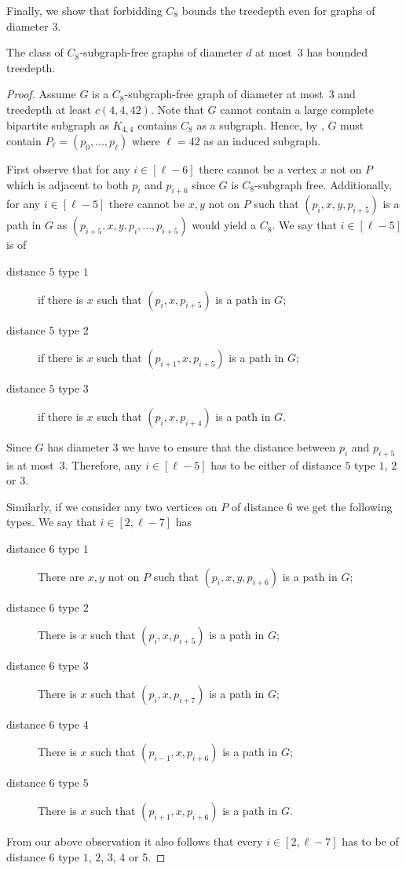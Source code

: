 \documentclass[runningheads,envcountsame]{llncs}
\begin{document}
Finally, we show that forbidding $C_8$ bounds the treedepth even for graphs of diameter $3$.
\begin{theorem}\label{thm:C8d3}
    The class of $C_8$-subgraph-free graphs of diameter $d$ at most~$3$ has bounded treedepth.
\end{theorem}
\begin{proof}
    Assume $G$ is a $C_8$-subgraph-free graph of diameter at most~$3$ and  treedepth at least $c(4,4,42)$. Note that $G$ cannot contain a large complete bipartite subgraph as $K_{4,4}$ contains $C_8$ as a subgraph. Hence, by , $G$ must contain $P_\ell=(p_0,\dots,p_\ell)$ where $\ell=42$ as an induced subgraph.

    First observe that for any $i\in [\ell-6]$  there cannot be a vertex $x$ not on $P$ which is adjacent to both $p_i$ and $p_{i+6}$ since $G$ is $C_8$-subgraph free. 
    Additionally, for any $i\in [\ell-5]$ there cannot be $x,y$ not on $P$ such that $(p_i,x,y,p_{i+5})$ is a path in $G$ as $(p_{i+5},x,y,p_i,\dots, p_{i+5})$ would yield a $C_8$. 
    We say that $i\in [\ell-5]$ is of 
    \begin{description}
        \item[distance $5$ type $1$] if there is $x$ such that $(p_i,x,p_{i+5})$ is a path in $G$;
        \item[distance $5$ type $2$] if there is $x$ such that $(p_{i+1},x,p_{i+5})$ is a path in $G$;
        \item[distance $5$ type $3$] if there is $x$ such that $(p_i,x,p_{i+4})$ is a path in $G$.
    \end{description}
    Since $G$ has diameter $3$ we have to ensure that the distance between $p_i$ and $p_{i+5}$ is at most~$3$. Therefore, any $i\in [\ell-5]$ has to be either of distance $5$ type $1$, $2$ or $3$.
    
    Similarly, if we consider any two vertices on $P$ of distance $6$ we get the following types. We say that $i\in [2,\ell-7]$ has  
    \begin{description}
        \item[distance $6$ type $1$] There are $x,y$ not on $P$ such that $(p_i,x, y, p_{i+6})$ is a path in $G$;
        \item[distance $6$ type $2$] There is $x$ such that $(p_i,x, p_{i+5})$ is a path in $G$;
        \item[distance $6$ type $3$] There is $x$ such that $(p_i,x, p_{i+7})$ is a path in $G$;
        \item[distance $6$ type $4$] There is $x$ such that $(p_{i-1},x, p_{i+6})$ is a path in $G$;
        \item[distance $6$ type $5$] There is $x$ such that $(p_{i+1},x, p_{i+6})$ is a path in $G$.
    \end{description}
    From our above observation it also follows that every $i\in [2,\ell-7]$ has to be of distance $6$ type $1$, $2$, 3, 4 or 5.


\end{proof}
\end{document}
